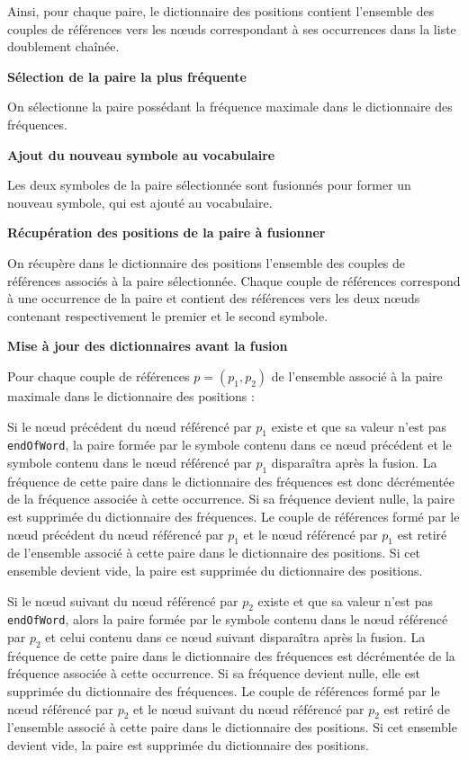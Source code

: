 \documentclass[12pt,a4paper]{report}
\begin{document}
\begin{enumerateFB}
		Ainsi, pour chaque paire, le dictionnaire des positions contient l’ensemble des couples de références vers les nœuds correspondant à ses occurrences dans la liste doublement chaînée.
		
		\item \textbf{Sélection de la paire la plus fréquente}
		
		On sélectionne la paire possédant la fréquence maximale dans le dictionnaire des fréquences.
		
		\item \textbf{Ajout du nouveau symbole au vocabulaire}
		
		Les deux symboles de la paire sélectionnée sont fusionnés pour former un nouveau symbole, qui est ajouté au vocabulaire.
		
		\item \textbf{Récupération des positions de la paire à fusionner}
		
		On récupère dans le dictionnaire des positions l’ensemble des couples de références associés à la paire sélectionnée. Chaque couple de références correspond à une occurrence de la paire et contient des références vers les deux nœuds contenant respectivement le premier et le second symbole.
		
		\item \textbf{Mise à jour des dictionnaires avant la fusion}
		
		Pour chaque couple de références $p=(p_1, p_2)$ de l’ensemble associé à la paire maximale dans le dictionnaire des positions :
		
		\begin{itemizeFB}
			\item Si le nœud précédent du nœud référencé par $p_1$ existe et que sa valeur n’est pas \texttt{endOfWord}, la paire formée par le symbole contenu dans ce nœud précédent et le symbole contenu dans le nœud référencé par $p_1$ disparaîtra après la fusion. La fréquence de cette paire dans le dictionnaire des fréquences est donc décrémentée de la fréquence associée à cette occurrence. Si sa fréquence devient nulle, la paire est supprimée du dictionnaire des fréquences. Le couple de références formé par le nœud précédent du nœud référencé par $p_1$ et le nœud référencé par $p_1$ est retiré de l’ensemble associé à cette paire dans le dictionnaire des positions. Si cet ensemble devient vide, la paire est supprimée du dictionnaire des positions.
			
			\item Si le nœud suivant du nœud référencé par $p_2$ existe et que sa valeur n’est pas \texttt{endOfWord}, alors la paire formée par le symbole contenu dans le nœud référencé par $p_2$ et celui contenu dans ce nœud suivant disparaîtra après la fusion. La fréquence de cette paire dans le dictionnaire des fréquences est décrémentée de la fréquence associée à cette occurrence. Si sa fréquence devient nulle, elle est supprimée du dictionnaire des fréquences. Le couple de références formé par le nœud référencé par $p_2$ et le nœud suivant du nœud référencé par $p_2$ est retiré de l’ensemble associé à cette paire dans le dictionnaire des positions. Si cet ensemble devient vide, la paire est supprimée du dictionnaire des positions.
			

\end{itemizeFB}
\end{enumerateFB}
\end{document}

